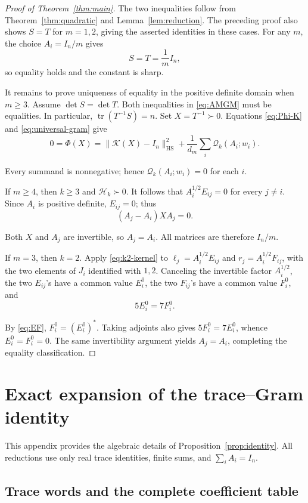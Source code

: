 \documentclass[11pt]{article}
\newcommand{\tr}{\operatorname{tr}}
\newcommand{\HS}{\mathrm{HS}}
\newcommand{\Id}{I_n}
\newcommand{\cK}{\mathcal K}
\newcommand{\gH}{\mathscr H}
\newcommand{\gQ}{\mathscr Q}
\newcommand{\nrm}[1]{\lVert #1\rVert}
\begin{document}
\begin{proof}[Proof of Theorem~\ref{thm:main}]
The two inequalities follow from Theorem~\ref{thm:quadratic} and
Lemma~\ref{lem:reduction}. The preceding proof also shows \(S=T\)
for \(m=1,2\), giving the asserted identities in these cases.
For any \(m\), the choice \(A_i=\Id/m\) gives
\[
 S=T=\frac1m\Id,
\]
so equality holds and the constant is sharp.

It remains to prove uniqueness of equality in the positive definite
domain when \(m\ge3\). Assume \(\det S=\det T\).
Both inequalities in \eqref{eq:AMGM} must be equalities. In particular,
\(\tr(T^{-1}S)=n\). Set \(X=T^{-1}\succ0\).
Equations \eqref{eq:Phi-K} and \eqref{eq:universal-gram} give
\[
 0=\Phi(X)=\nrm{\cK(X)-\Id}_{\HS}^2
       +\frac1{d_m}\sum_i\gQ_k(A_i;w_i).
\]

Every summand is nonnegative; hence
\(\gQ_k(A_i;w_i)=0\) for each \(i\).

If \(m\ge4\), then \(k\ge3\) and \(\gH_k\succ0\).
It follows that \(A_i^{1/2}E_{ij}=0\) for every \(j\ne i\).
Since \(A_i\) is positive definite, \(E_{ij}=0\); thus
\[
 (A_j-A_i)XA_j=0.
\]

Both \(X\) and \(A_j\) are invertible, so \(A_j=A_i\).
All matrices are therefore \(\Id/m\).

If \(m=3\), then \(k=2\). Apply \eqref{eq:k2-kernel} to
\(\ell_j=A_i^{1/2}E_{ij}\) and
\(r_j=A_i^{1/2}F_{ij}\), with the two elements of \(J_i\)
identified with \(1,2\).
Canceling the invertible factor \(A_i^{1/2}\), the two
\(E_{ij}\)'s have a common value \(E_i^0\), the two
\(F_{ij}\)'s have a common value \(F_i^0\), and
\[
 5E_i^0=7F_i^0.
\]

By \eqref{eq:EF}, \(F_i^0=(E_i^0)^*\). Taking adjoints also gives
\(5F_i^0=7E_i^0\), whence \(E_i^0=F_i^0=0\).
The same invertibility argument yields \(A_j=A_i\), completing the
equality classification.
\end{proof}

\appendix
\section{Exact expansion of the trace--Gram identity}
\label{app:identity}

This appendix provides the algebraic details of
Proposition~\ref{prop:identity}. All reductions use only real trace
identities, finite sums, and \(\sum_iA_i=\Id\).

\subsection{Trace words and the complete coefficient table}
\end{document}
